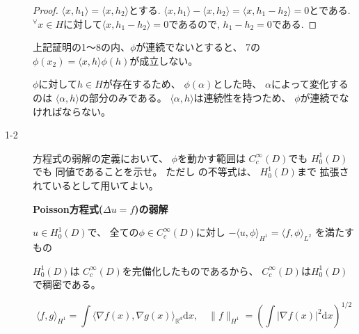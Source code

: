 \documentclass[12pt,b5paper]{ltjsarticle}
\begin{document}
\begin{description}
\begin{proof}
            $\langle x,h_{1} \rangle = \langle x,h_{2} \rangle$とする.
            $\langle x,h_{1} \rangle - \langle x,h_{2} \rangle = \langle x,h_{1} - h_{2} \rangle=0$とである.
            ${}^\forall x \in H$に対して$\langle x,h_{1} - h_{2} \rangle=0$であるので,
            $h_{1}-h_{2}=0$である.
            \end{proof}

            \dotfill

            上記証明の1～8の内、$\phi$が連続でないとすると、
            7の$\phi(x_{2}) = \langle x,h \rangle \phi(h)$が成立しない。

            $\phi$に対して$h\in H$が存在するため、
            $\phi(\alpha)$とした時、
            $\alpha$によって変化するのは
            $\langle \alpha,h \rangle$の部分のみである。
            $\langle \alpha,h \rangle$は連続性を持つため、
            $\phi$が連続でなければならない。

            \hrulefill

 \item[1-2]
             方程式の弱解の定義において、
            $\phi$を動かす範囲は
            $C_{c}^{\infty}(D)$でも
            $H_{0}^{1}(D)$でも
            同値であることを示せ。
            ただし  の不等式は、
            $H_{0}^{1}(D)$まで
            拡張されているとして用いてよい。


            \textbf{Poisson方程式($\Delta u = f$)の弱解}
            
            $u\in H_{0}^{1}(D)$で、
            全ての$\phi \in C_{c}^{\infty}(D)$に対し
            $-\langle u,\phi \rangle _{H^{1}}=\langle f,\phi \rangle_{L^{2}}$
            を満たすもの

            \dotfill


            $H_{0}^{1}(D)$は
            $C_{c}^{\infty}(D)$を完備化したものであるから、
            $C_{c}^{\infty}(D)$は$H_{0}^{1}(D)$で稠密である。



            \begin{equation}
             \langle f,g \rangle_{H^{1}}
              =\int \langle \nabla f(x), \nabla g(x) \rangle_{\mathbb{R}^{d}} \mathrm{d}x
              ,\quad
              \| f \|_{H^{1}}
              = \left( \int \lvert \nabla f(x) \rvert^{2} \mathrm{d}x \right)^{1/2}
            \end{equation}


\end{description}
\end{document}
